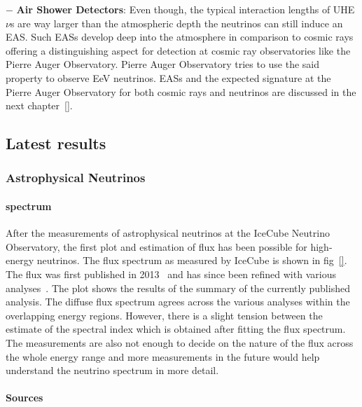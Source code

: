 \begin{description}
  \item $-$ \textbf{Air Shower Detectors}: Even though, the typical interaction lengths of UHE$\nu$s are way larger than the atmospheric depth the neutrinos can still induce an EAS. Such EASs develop deep into the atmosphere in comparison to cosmic rays offering a distinguishing aspect for detection at cosmic ray observatories like the Pierre Auger Observatory. Pierre Auger Observatory tries to use the said property to observe EeV neutrinos. EASs and the expected signature at the Pierre Auger Observatory for both cosmic rays and neutrinos are discussed in the next chapter~\ref{}.   

  \end{description}

\subsection{Latest results}
  \label{subsec:Nuresults}
  
\subsubsection*{Astrophysical Neutrinos}
  
  \paragraph*{spectrum}
    \label{subsubsec:Nuspectrum}
  After the measurements of astrophysical neutrinos at the IceCube Neutrino Observatory, the first plot and estimation of flux has been possible for high-energy neutrinos. The flux spectrum as measured by IceCube is shown in fig~\ref{}. The flux was first published in 2013~\cite{} and has since been refined with various analyses~\cite{}. The plot shows the results of the summary of the currently published analysis. The diffuse flux spectrum agrees across the various analyses within the overlapping energy regions. However, there is a slight tension between the estimate of the spectral index which is obtained after fitting the flux spectrum. The measurements are also not enough to decide on the nature of the flux across the whole energy range and more measurements in the future would help understand the neutrino spectrum in more detail. 

  \paragraph*{Sources}
    \label{subsubsec:Nusources}
  
